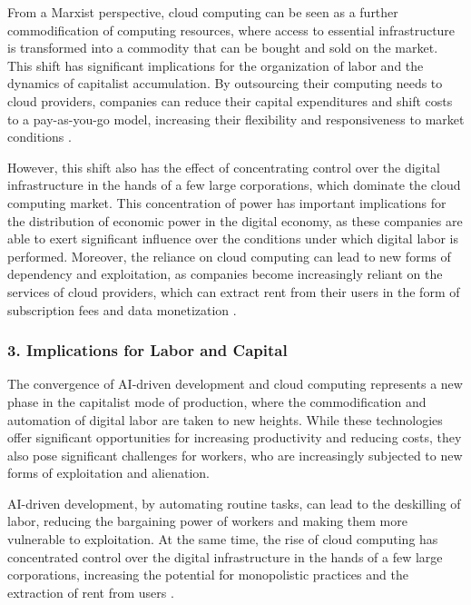 \begin{refsection}
\begin{multicols}{2}
{From a Marxist perspective, cloud computing can be seen as a further commodification of computing resources, where access to essential infrastructure is transformed into a commodity that can be bought and sold on the market. This shift has significant implications for the organization of labor and the dynamics of capitalist accumulation. By outsourcing their computing needs to cloud providers, companies can reduce their capital expenditures and shift costs to a pay-as-you-go model, increasing their flexibility and responsiveness to market conditions \cite{fuchs2014digital}.

However, this shift also has the effect of concentrating control over the digital infrastructure in the hands of a few large corporations, which dominate the cloud computing market. This concentration of power has important implications for the distribution of economic power in the digital economy, as these companies are able to exert significant influence over the conditions under which digital labor is performed. Moreover, the reliance on cloud computing can lead to new forms of dependency and exploitation, as companies become increasingly reliant on the services of cloud providers, which can extract rent from their users in the form of subscription fees and data monetization \cite{zuboff2015surveillance}.

\subsubsection*{3. Implications for Labor and Capital}

The convergence of AI-driven development and cloud computing represents a new phase in the capitalist mode of production, where the commodification and automation of digital labor are taken to new heights. While these technologies offer significant opportunities for increasing productivity and reducing costs, they also pose significant challenges for workers, who are increasingly subjected to new forms of exploitation and alienation.

AI-driven development, by automating routine tasks, can lead to the deskilling of labor, reducing the bargaining power of workers and making them more vulnerable to exploitation. At the same time, the rise of cloud computing has concentrated control over the digital infrastructure in the hands of a few large corporations, increasing the potential for monopolistic practices and the extraction of rent from users \cite{foster2007financialization}.

}
\end{multicols}
\end{refsection}
